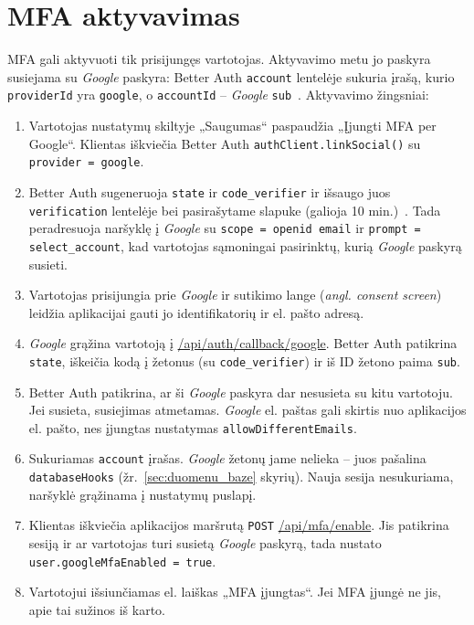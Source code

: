 \section{MFA aktyvavimas}
\label{sec:aktyvavimas}

MFA gali aktyvuoti tik prisijungęs vartotojas. Aktyvavimo metu jo paskyra susiejama su \textit{Google} paskyra: Better Auth \texttt{account} lentelėje sukuria įrašą, kurio \texttt{providerId} yra \texttt{google}, o \texttt{accountId} -- \textit{Google} \texttt{sub}~\cite{better_auth_accounts}. Aktyvavimo žingsniai:
\begin{enumerate}
    \item Vartotojas nustatymų skiltyje „Saugumas“ paspaudžia „Įjungti MFA per Google“. Klientas iškviečia Better Auth \texttt{authClient.linkSocial()} su \texttt{provider = google}.
    \item Better Auth sugeneruoja \texttt{state} ir \texttt{code\_verifier} ir išsaugo juos \texttt{verification} lentelėje bei pasirašytame slapuke (galioja 10 min.)~\cite{better_auth_security}. Tada peradresuoja naršyklę į \textit{Google} su \texttt{scope = openid email} ir \texttt{prompt = select\_account}, kad vartotojas sąmoningai pasirinktų, kurią \textit{Google} paskyrą susieti.
    \item Vartotojas prisijungia prie \textit{Google} ir sutikimo lange (\textit{angl. consent screen}) leidžia aplikacijai gauti jo identifikatorių ir el. pašto adresą.
    \item \textit{Google} grąžina vartotoją į \url{/api/auth/callback/google}. Better Auth patikrina \texttt{state}, iškeičia kodą į žetonus (su \texttt{code\_verifier}) ir iš ID žetono paima \texttt{sub}.
    \item Better Auth patikrina, ar ši \textit{Google} paskyra dar nesusieta su kitu vartotoju. Jei susieta, susiejimas atmetamas. \textit{Google} el. paštas gali skirtis nuo aplikacijos el. pašto, nes įjungtas nustatymas \texttt{allowDifferentEmails}.
    \item Sukuriamas \texttt{account} įrašas. \textit{Google} žetonų jame nelieka -- juos pašalina \texttt{databaseHooks} (žr.~\ref{sec:duomenu_baze} skyrių). Nauja sesija nesukuriama, naršyklė grąžinama į nustatymų puslapį.
    \item Klientas iškviečia aplikacijos maršrutą \texttt{POST} \url{/api/mfa/enable}. Jis patikrina sesiją ir ar vartotojas turi susietą \textit{Google} paskyrą, tada nustato \texttt{user.googleMfaEnabled = true}.
    \item Vartotojui išsiunčiamas el. laiškas „MFA įjungtas“. Jei MFA įjungė ne jis, apie tai sužinos iš karto.
\end{enumerate}
